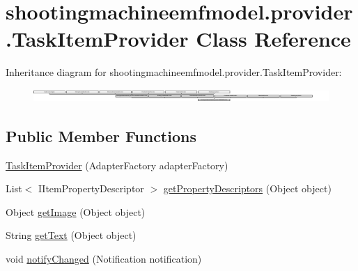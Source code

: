 \hypertarget{classshootingmachineemfmodel_1_1provider_1_1_task_item_provider}{\section{shootingmachineemfmodel.\-provider.\-Task\-Item\-Provider Class Reference}
\label{classshootingmachineemfmodel_1_1provider_1_1_task_item_provider}
}
Inheritance diagram for shootingmachineemfmodel.\-provider.\-Task\-Item\-Provider\-:\begin{figure}[H]
\begin{center}
\leavevmode
\includegraphics[height=0.499109cm]{classshootingmachineemfmodel_1_1provider_1_1_task_item_provider}
\end{center}
\end{figure}
\subsection*{Public Member Functions}
\begin{DoxyCompactItemize}
\item 
\hyperlink{classshootingmachineemfmodel_1_1provider_1_1_task_item_provider_a022c119e6d1988032cd33066c953950a}{Task\-Item\-Provider} (Adapter\-Factory adapter\-Factory)
\item 
List$<$ I\-Item\-Property\-Descriptor $>$ \hyperlink{classshootingmachineemfmodel_1_1provider_1_1_task_item_provider_a1c5f0144063267163ff379eb77d7f94e}{get\-Property\-Descriptors} (Object object)
\item 
Object \hyperlink{classshootingmachineemfmodel_1_1provider_1_1_task_item_provider_a8bdfa0dfb1a708c8a50cb56ac93f3c19}{get\-Image} (Object object)
\item 
String \hyperlink{classshootingmachineemfmodel_1_1provider_1_1_task_item_provider_a56b5041fbc9b11d69c9c47e60672b893}{get\-Text} (Object object)
\item 
void \hyperlink{classshootingmachineemfmodel_1_1provider_1_1_task_item_provider_ad06d7247255b63f8ff7c6ad7fb8b56fd}{notify\-Changed} (Notification notification)
\end{DoxyCompactItemize}
